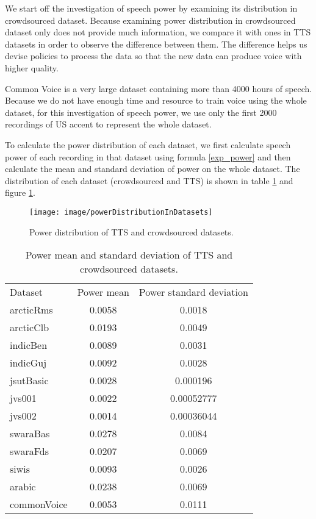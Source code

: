 \documentclass[12pt]{article}
\begin{document}
We start off the investigation of speech power by examining its distribution in crowdsourced dataset. Because examining power distribution in crowdsourced dataset only does not provide much information, we compare it with ones in TTS datasets in order to observe the difference between them. The difference helps us devise policies to process the data so that the new data can produce voice with higher quality.

Common Voice is a very large dataset containing more than 4000 hours of speech. Because we do not have enough time and resource to train voice using the whole dataset, for this investigation of speech power, we use only the first 2000 recordings of US accent to represent the whole dataset.

To calculate the power distribution of each dataset, we first calculate speech power of each recording in that dataset using formula \ref{exp_power} and then calculate the mean and standard deviation of power on the whole dataset. The distribution of each dataset (crowdsourced and TTS) is shown in table \ref{tab_powerDistribution} and figure \ref{fig_powerDistribution}.

\begin{figure}[t]
\begin{center}
\texttt{[image: image/powerDistributionInDatasets]}
\end{center}
\vspace{-0.3cm}
\caption[Power distribution in TTS and crowdsourced datasets.]{Power distribution of TTS and crowdsourced datasets.}
\label{fig_powerDistribution}
\end{figure}

\begin{table}[]
\begin{center}
\caption{Power mean and standard deviation of TTS and crowdsourced datasets.}
\label{tab_powerDistribution}
\vspace{3mm}
\begin{tabular}{lcc}
\hline
Dataset & Power mean & Power standard deviation \\
\cmidrule(l{0pt}r{2pt}){1-1}\cmidrule(l{0pt}r{2pt}){2-2}\cmidrule(l{0pt}r{2pt}){3-3}
arcticRms   & 0.0058 & 0.0018 \\
arcticClb   & 0.0193 & 0.0049 \\
indicBen    & 0.0089 & 0.0031 \\
indicGuj    & 0.0092 & 0.0028 \\
jsutBasic   & 0.0028 & 0.000196 \\
jvs001      & 0.0022 & 0.00052777 \\
jvs002      & 0.0014 & 0.00036044 \\
swaraBas    & 0.0278 & 0.0084 \\
swaraFds    & 0.0207 & 0.0069 \\
siwis       & 0.0093 & 0.0026 \\
arabic      & 0.0238 & 0.0069 \\
commonVoice & 0.0053 & 0.0111 \\
\hline
\end{tabular}
\end{center}
\end{table}
\end{document}
